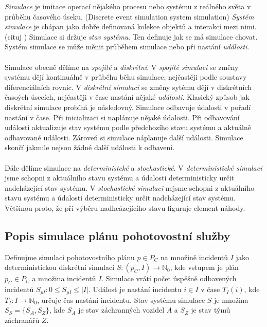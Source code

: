 \textit{Simulace} je imitace operací nějakého procesu nebo systému z reálného světa v průběhu časového úseku. (Discrete event simulation system simulation) %
\textit{Systém simulace} je chápan jako dobře definovaná kolekce objektů a interakcí mezi nimi. (cituj ) %
Simulace si držuje \textit{stav systému}. Ten definuje jak se má simulace chovat.
Systém simulace se může měnit průběhem simulace nebo při nastání \textit{události}.
\\
\\
Simulace obecně dělíme na \textit{spojité} a \textit{diskrétní}.
V \textit{spojité simulaci} se změny systému dějí kontinuálně v průběhu běhu simulace, nejčastěji podle soustavy diferenciálních rovnic.
V \textit{diskrétní simulaci} se změny sytému dějí v diskrétních časoých úsecích, nejčastěji v čase nastání nějaké \textit{události}.
Klasický způsob jak diskrétní simulace probíhá je následovný.
Simulace odbavuje údalosti v pořadí nastání v čase.
Při inicializaci si naplánuje nějaké údalosti.
Při odbavování události aktualizuje stav systému podle předchozího stavu systému a aktuálně odbavované události. Zároveň si simulace náplanuje další události. 
Simulace skončí jakmile nejsou žádné další události k odbavení.
\\
\\
Dále dělíme simulace na \textit{deterministcké} a \textit{stochastické}.
V \textit{deterministické simulaci} jsme schopni z aktuálního stavu systému a údalosti deterministicky určit nadcházející stav systému.
V \textit{stochastické simulaci} nejsme schopni z aktuálního stavu systému a údalosti deterministicky určit nadcházející stav systému.
Většinou proto, že při výběru nadhcázejícího stavu figuruje element náhody.

\clearpage

\subsection{Popis simulace plánu pohotovostní služby}

Definujme simulaci pohotovostního plánu $p \in P_C$ na množině incidentů $I$ jako deterministickou diskrétní simulaci
$S \colon (p_C, I) \rightarrow \mathbb{N}_0$, kde vstupem je plán $p_C \in P_C$ a množina incidentů $I$.
Simulace vrátí počet úspěšně odbavených incidentů $S_{pI} \colon 0 \leq S_{pI} \leq |I|$.
Událost je nastání incidentu $i \in I$ v čase $T_I(i)$, kde $T_I \colon I \rightarrow \mathbb{N}_0$, určuje čas nastání incidentu.
Stav systému simulace $S$ je množina $S_S = \{ S_A, S_Z \}$, kde $S_A$ je stav záchranných vozidel $A$ a $S_Z$ je stav týmů záchranářů $Z$. 

